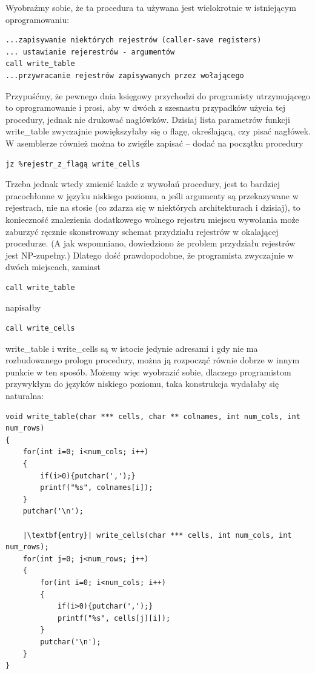 Wyobraźmy sobie, że ta procedura ta używana jest wielokrotnie w istniejącym oprogramowaniu:
\begin{lstlisting}
...zapisywanie niektórych rejestrów (caller-save registers)
... ustawianie rejerestrów - argumentów
call write_table
...przywracanie rejestrów zapisywanych przez wołającego
\end{lstlisting}
Przypuśćmy, że pewnego dnia księgowy przychodzi do programisty utrzymującego to oprogramowanie i prosi, aby w dwóch z szesnastu przypadków użycia tej procedury, jednak nie drukować nagłówków. Dzisiaj lista parametrów funkcji write\_table zwyczajnie powiększyłaby się o flagę, określającą, czy pisać nagłówek. W asemblerze również można to zwięźle zapisać – dodać na początku procedury
\begin{lstlisting}
jz %rejestr_z_flagą write_cells
\end{lstlisting}
Trzeba jednak wtedy zmienić każde z wywołań procedury, jest to bardziej pracochłonne w języku niskiego poziomu, a jeśli argumenty są przekazywane w rejestrach, nie na stosie (co zdarza się w niektórych architekturach i dzisiaj), to konieczność znalezienia dodatkowego wolnego rejestru miejscu wywołania może zaburzyć ręcznie skonstrowany schemat przydziału rejestrów w okalającej procedurze. (A jak wspomniano, dowiedziono że problem przydziału rejestrów jest NP-zupełny.\cite{REGISTER_ALLOCATION_CHAITIN1981}) Dlatego dość prawdopodobne, że programista zwyczajnie w dwóch miejscach, zamiast
\begin{lstlisting}
call write_table
\end{lstlisting}
napisałby 
\begin{lstlisting}
call write_cells
\end{lstlisting}
write\_table i write\_cells są w istocie jedynie adresami i gdy nie ma rozbudowanego prologu procedury, można ją rozpocząć równie dobrze w innym punkcie w ten sposób. Możemy więc wyobrazić sobie, dlaczego programistom przywykłym do języków niskiego poziomu, taka konstrukcja wydałaby się naturalna:


\lstset{
    escapechar=|,
    breaklines=true
}
\begin{lstlisting}
void write_table(char *** cells, char ** colnames, int num_cols, int num_rows)
{
    for(int i=0; i<num_cols; i++)
    {
        if(i>0){putchar(',');}
        printf("%s", colnames[i]);
    }
    putchar('\n');
    
    |\textbf{entry}| write_cells(char *** cells, int num_cols, int num_rows);
    for(int j=0; j<num_rows; j++)
    {
        for(int i=0; i<num_cols; i++)
        {
            if(i>0){putchar(',');}
            printf("%s", cells[j][i]);
        }
        putchar('\n');
    }
}
\end{lstlisting}

